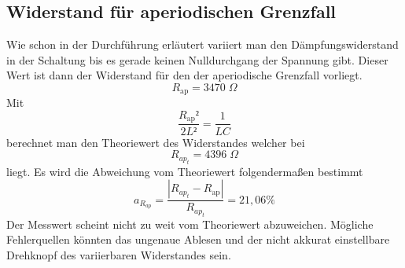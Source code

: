 \documentclass[titlepage = firstcover]{scrartcl}
\begin{document}
        \subsection{Widerstand für aperiodischen Grenzfall}
            Wie schon in der Durchführung erläutert variiert man den Dämpfungswiderstand in der Schaltung bis es gerade keinen Nulldurchgang der Spannung gibt.
            Dieser Wert ist dann der Widerstand für den der aperiodische Grenzfall vorliegt.
            \begin{equation*}
                R_\text{ap} = 3470 \; \Omega
            \end{equation*}
            Mit
            \begin{equation*}
                \frac{R_\text{ap}²}{2L²} = \frac{1}{LC}
            \end{equation*} 
            berechnet man den Theoriewert des Widerstandes welcher bei
            \begin{equation*}
                R_{ap_t} = 4396 \; \Omega
            \end{equation*}
            liegt.
            Es wird die Abweichung vom Theoriewert folgendermaßen bestimmt
            \begin{equation}
                a_{R_{ap}} = \frac{|R_{ap_t} - R_\text{ap}|}{R_{ap_t}} = 21,06 \%
                \label{eqn:abweichung}
            \end{equation}
            Der Messwert scheint nicht zu weit vom Theoriewert abzuweichen. Mögliche Fehlerquellen könnten das ungenaue Ablesen und der nicht akkurat einstellbare Drehknopf des variierbaren Widerstandes sein.
            
\end{document}

